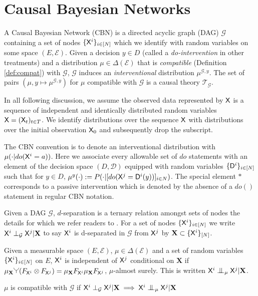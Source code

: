 \section{Causal Bayesian Networks}

A Causal Bayesian Network (CBN) is a directed acyclic graph (DAG) $\mathcal{G}$ containing a set of nodes $\{\mathsf{X}^i\}_{i\in[N]}$ which we identify with random variables on some space $(E,\mathcal{E})$. Given a decision $y\in D$ (called a \emph{do-intervention} in other treatments) and a distribution $\mu\in \Delta(\mathcal{E})$ that is \emph{compatible} (Definition \ref{def:compat}) with $\mathcal{G}$, $\mathcal{G}$ induces an \emph{interventional} distribution $\mu^{\mathcal{G},y}$. The set of pairs $(\mu,y\mapsto \mu^{\mathcal{G},y})$ for $\mu$ compatible with $\mathcal{G}$ is a causal theory $\mathscr{T}_{\mathcal{G}}$.

In all following discussion, we assume the observed data represented by $\mathsf{X}$ is a sequence of independent and identically distributed random variables $\mathsf{X}=(\mathsf{X}_t)_{t\in T}$. We identify distributions over the sequence $\mathsf{X}$ with distributions over the initial observation $\mathsf{X}_0$ and subsequently drop the subscript.

The CBN convention is to denote an interventional distribution with $\mu(\cdot|do(\mathsf{X}^i=a))$. Here we associate every allowable set of $do$ statements with an element of the decision space $(D,\mathcal{D})$ equipped with random variables $\{\mathsf{D}^i\}_{i\in[N]}$ such that for $y\in D$, $\mu^y(\cdot) := P(\cdot|[do(\mathsf{X}^j=\mathsf{D}^i(y))]_{i\in N})$. The special element $*$ corresponds to a passive intervention which is denoted by the absence of a $do()$ statement in regular CBN notation.

\begin{definition}[Compatibility]\label{def:compat}
Given a DAG $\mathcal{G}$, $d$-separation is a ternary relation amongst sets of nodes the details for which we refer readers to \cite{pearl_causality:_2009}. For a set of nodes $\{\mathsf{X}^i\}_{i\in[N]}$ we write $\mathsf{X}^i\perp_{\mathcal{G}} \mathsf{X}^j | \mathbf{X}$ to say $\mathsf{X}^i$ is d-separated in $\mathcal{G}$ from $\mathsf{X}^j$ by $\mathbf{X}\subset \{\mathsf{X}^i\}_{[N]}$.

Given a measurable space $(E,\mathcal{E})$, $\mu\in \Delta(\mathcal{E})$ and a set of random variables $\{\mathsf{X}^i\}_{i\in[N]}$ on $E$, $\mathsf{X}^i$ is independent of $\mathsf{X}^j$ conditional on $\mathbf{X}$ if $\mu_{\mathbf{X}} \splitter{0.13}(F_{\RV{X}^i}\otimes F_{\RV{X}^j}) = \mu_{\mathbf{X}} F_{\RV{X}^i} \mu_{\mathbf{X}}F_{\RV{X}^j}$, $\mu$-almost surely. This is written $\RV{X}^i\CI_\mu \RV{X}^j|\mathbf{X}$.

$\mu$ is compatible with $\mathcal{G}$ if $\RV{X}^i\perp_{\mathcal{G}} \RV{X}^j | \mathbf{X} \implies \RV{X}^i\CI_\mu \RV{X}^j|\mathbf{X}$
\end{definition}

